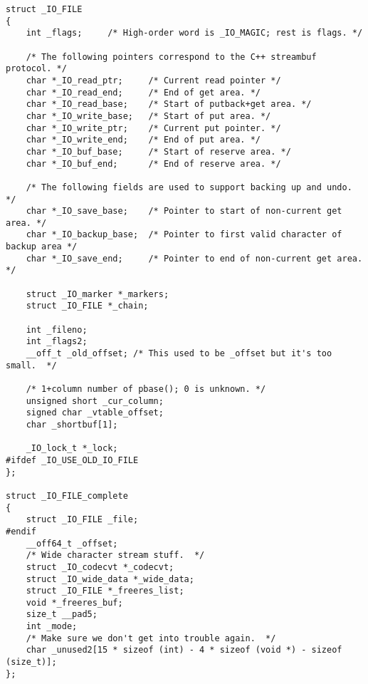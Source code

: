 
\begin{lstlisting}
struct _IO_FILE
{
    int _flags;		/* High-order word is _IO_MAGIC; rest is flags. */

    /* The following pointers correspond to the C++ streambuf protocol. */
    char *_IO_read_ptr;	    /* Current read pointer */
    char *_IO_read_end;	    /* End of get area. */
    char *_IO_read_base;	/* Start of putback+get area. */
    char *_IO_write_base;	/* Start of put area. */
    char *_IO_write_ptr;	/* Current put pointer. */
    char *_IO_write_end;	/* End of put area. */
    char *_IO_buf_base;	    /* Start of reserve area. */
    char *_IO_buf_end;	    /* End of reserve area. */

    /* The following fields are used to support backing up and undo. */
    char *_IO_save_base;    /* Pointer to start of non-current get area. */
    char *_IO_backup_base;  /* Pointer to first valid character of backup area */
    char *_IO_save_end;     /* Pointer to end of non-current get area. */

    struct _IO_marker *_markers;
    struct _IO_FILE *_chain;

    int _fileno;
    int _flags2;
    __off_t _old_offset; /* This used to be _offset but it's too small.  */
 
    /* 1+column number of pbase(); 0 is unknown. */
    unsigned short _cur_column;
    signed char _vtable_offset;
    char _shortbuf[1];
 
    _IO_lock_t *_lock;
#ifdef _IO_USE_OLD_IO_FILE
};
 
struct _IO_FILE_complete
{
    struct _IO_FILE _file;
#endif
    __off64_t _offset;
    /* Wide character stream stuff.  */
    struct _IO_codecvt *_codecvt;
    struct _IO_wide_data *_wide_data;
    struct _IO_FILE *_freeres_list;
    void *_freeres_buf;
    size_t __pad5;
    int _mode;
    /* Make sure we don't get into trouble again.  */
    char _unused2[15 * sizeof (int) - 4 * sizeof (void *) - sizeof (size_t)];
};
\end{lstlisting}
